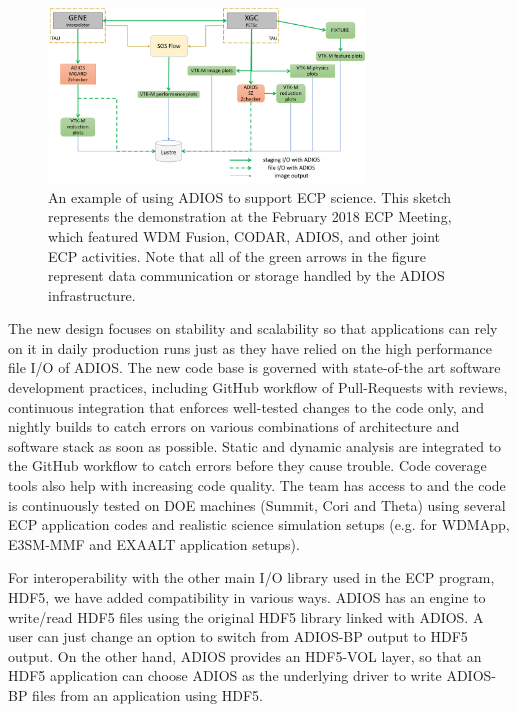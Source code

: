 \begin{figure}[!th]
	\begin{center}
		\includegraphics[width=0.75\textwidth]{projects/2.3.4-DataViz/2.3.4.09-ADIOS/ADIOS_in_ECP.png}
		\caption{An example of using ADIOS to support ECP science.  This sketch represents the demonstration at the February 2018 ECP Meeting, which featured WDM Fusion, CODAR, ADIOS, and other joint ECP activities.  Note that all of the green arrows in the figure represent data communication or storage handled by the ADIOS infrastructure.}
		\label{fig:adios-example}
	\end{center}
\end{figure}

The new design focuses on stability and scalability so that applications can rely on it in daily production runs just as they have relied on the high performance file I/O of ADIOS. The new code base is governed with state-of-the art software development practices, including GitHub workflow of Pull-Requests with reviews, continuous integration that enforces well-tested changes to the code only, and nightly builds to catch errors on various combinations of architecture and software stack as soon as possible. Static and dynamic analysis are integrated to the GitHub workflow to catch errors before they cause trouble. Code coverage tools also help with increasing code quality. The team has access to and the code is continuously tested on DOE machines (Summit, Cori and Theta) using several ECP application codes and realistic science simulation setups (e.g. for WDMApp, E3SM-MMF and EXAALT application setups). 

For interoperability with the other main I/O library used in the ECP program, HDF5, we have added compatibility in various ways.
ADIOS has an engine to write/read HDF5 files using the original HDF5 library linked with ADIOS. A user can just change an option to switch from ADIOS-BP output to HDF5 output. On the other hand, ADIOS provides an HDF5-VOL layer, so that an HDF5 application can choose ADIOS as the underlying driver to write ADIOS-BP files from an application using HDF5. 

